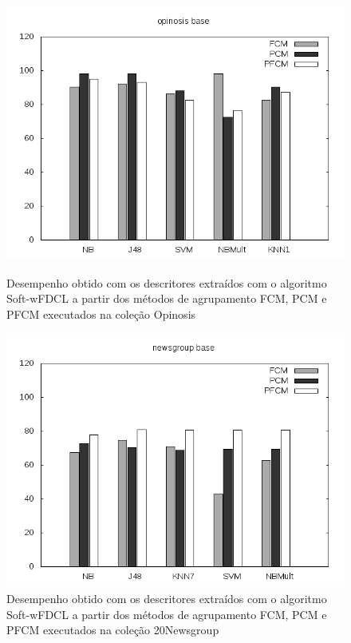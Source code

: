 \begin{figure}[!htp] \centering 
   \begin{minipage}{0.45\textwidth} 
     \centering
    \includegraphics[width=1.0\columnwidth]{assets/pfcm/opinosis} 
    \caption{Desempenho obtido com os descritores extraídos com o algoritmo Soft-wFDCL a partir dos
      métodos de agrupamento FCM,
    PCM e PFCM executados na coleção Opinosis} 
  \label{fig:pfcmopinosis}
  \end{minipage}\hfill 
  \begin{minipage}{0.45\textwidth} \centering
    \includegraphics[width=1.0\columnwidth]{assets/pfcm/newsgroup} 
    \caption{Desempenho obtido com os descritores extraídos com o algoritmo Soft-wFDCL a partir dos
      métodos de agrupamento FCM,
    PCM e PFCM executados na coleção 20Newsgroup} 
     \label{fig:pfcm20news} 
   \end{minipage} 
\end{figure}

